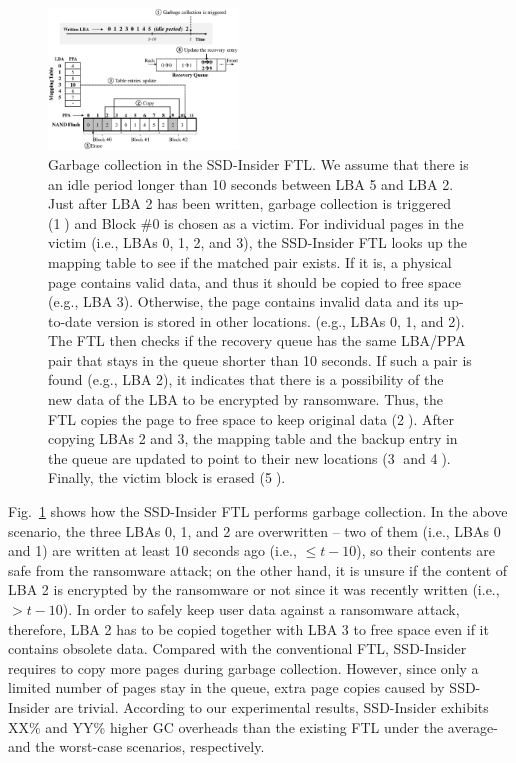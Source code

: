\documentclass[conference]{IEEEtran}
\newcommand{\ours}{SSD-Insider}
\begin{document}
\begin{figure}
\centering
\includegraphics[width=0.45\textwidth]{fig/flash-fig4}
\caption{
Garbage collection in the \ours{} FTL. We assume that there is
an idle period longer than 10 seconds between LBA 5 and LBA 2. Just
after LBA 2 has been written, garbage collection is triggered
(\textcircled{1}) and Block \#0 is chosen as a victim. For
individual pages in the victim (i.e., LBAs 0, 1, 2, and 3), the
\ours{} FTL looks up the mapping table to see if the matched
pair exists.  If it is, a physical page contains valid data, and
thus it should be copied to free space (e.g., LBA 3).  Otherwise,
the page contains invalid data and its up-to-date version is stored
in other locations. (e.g., LBAs 0, 1, and 2).  The FTL then checks
if the recovery queue has the same LBA/PPA pair that stays in the
queue shorter than 10 seconds.  If such a pair is found (e.g., LBA
2), it indicates that there is a possibility of the new data of the
LBA to be encrypted by ransomware.  Thus, the FTL copies the page
to free space to keep original data (\textcircled{2}).  After
copying LBAs 2 and 3, the mapping table and the backup entry in the
queue are updated to point to their new locations (\textcircled{3}
and \textcircled{4}).  Finally, the victim block is erased
(\textcircled{5}).
}
\label{fig:gc}
\end{figure}

Fig.~\ref{fig:gc} shows how the \ours{} FTL performs garbage collection.  In
the above scenario, the three LBAs 0, 1, and 2 are overwritten -- two of them
(i.e., LBAs 0 and 1) are written at least 10 seconds ago (i.e., $\leq t-10$),
so their contents are safe from the ransomware attack; on the other hand, it is
unsure if the content of LBA 2 is encrypted by the ransomware or not since it
was recently written (i.e., $> t- 10$).  In order to safely keep user data
against a ransomware attack, therefore, LBA 2 has to be copied together with
LBA 3 to free space even if it contains obsolete data.  Compared with the
conventional FTL, \ours{} requires to copy more pages during garbage
collection.  However, since only a limited number of pages stay in the queue,
extra page copies caused by \ours{} are trivial.  According to our experimental
results, \ours{} exhibits {\color{red}XX\% and YY\%} higher GC overheads than
the existing FTL under the average- and the worst-case scenarios, respectively.
\end{document}
